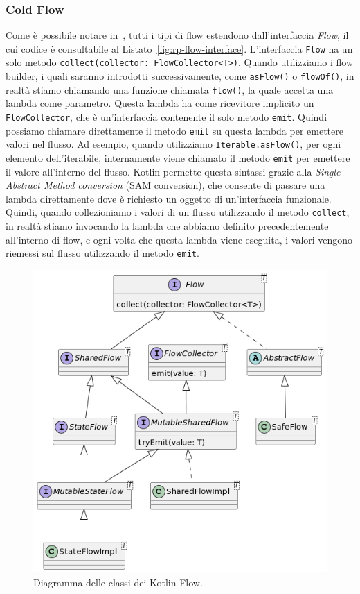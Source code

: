 \documentclass[12pt,a4paper,openright,twoside]{book}
\begin{document}
\subsubsection{Cold Flow}
\label{sec:cold-flow}
Come è possibile notare in~, tutti i tipi di flow estendono dall'interfaccia \textit{Flow}, il cui codice è consultabile al Listato~\ref{fig:rp-flow-interface}.
L'interfaccia \texttt{Flow} ha un solo metodo \texttt{collect(collector: FlowCollector<T>)}. 
Quando utilizziamo i flow builder, i quali saranno introdotti successivamente, come \texttt{asFlow()} o \texttt{flowOf()}, in realtà stiamo chiamando una funzione chiamata \texttt{flow()}, la quale accetta una lambda come parametro. Questa lambda ha come ricevitore implicito un \texttt{FlowCollector}, che è un'interfaccia contenente il solo metodo \texttt{emit}.
Quindi possiamo chiamare direttamente il metodo \texttt{emit} su questa lambda per emettere valori nel flusso. Ad esempio, quando utilizziamo \texttt{Iterable.asFlow()}, per ogni elemento dell'iterabile, internamente viene chiamato il metodo \texttt{emit} per emettere il valore all'interno del flusso.
Kotlin permette questa sintassi grazie alla \textit{Single Abstract Method conversion} (SAM conversion), che consente di passare una lambda direttamente dove è richiesto un oggetto di un'interfaccia funzionale.
Quindi, quando collezioniamo i valori di un flusso utilizzando il metodo \texttt{collect}, in realtà stiamo invocando la lambda che abbiamo definito precedentemente all'interno di flow, e ogni volta che questa lambda viene eseguita, i valori vengono riemessi sul flusso utilizzando il metodo \texttt{emit}.



\begin{figure}
    \centering
    \includegraphics[width=.80\linewidth]{figures/reactive-programming/flow-class-diagram.png}
    \caption{Diagramma delle classi dei Kotlin Flow.}
    \label{fig:rp-flow-class-diagram}
\end{figure}
\end{document}
